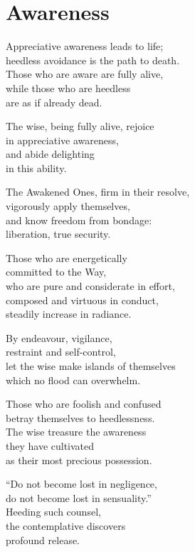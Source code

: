 
\chapter{Awareness}

Appreciative awareness leads to life;\\
heedless avoidance is the path to death.\\
Those who are aware are fully alive,\\
while those who are heedless\\
are as if already dead.

The wise, being fully alive, rejoice\\
in appreciative awareness,\\
and abide delighting\\
in this ability.


The Awakened Ones, firm in their resolve,\\
vigorously apply themselves,\\
and know freedom from bondage:\\
liberation, true security.


Those who are energetically\\
committed to the Way,\\
who are pure and considerate in effort,\\
composed and virtuous in conduct,\\
steadily increase in radiance.


By endeavour, vigilance,\\
restraint and self-control,\\
let the wise make islands of themselves\\
which no flood can overwhelm.



Those who are foolish and confused\\
betray themselves to heedlessness.\\
The wise treasure the awareness\\
they have cultivated\\
as their most precious possession.


“Do not become lost in negligence,\\
do not become lost in sensuality.”\\
Heeding such counsel,\\
the contemplative discovers\\
profound release.

